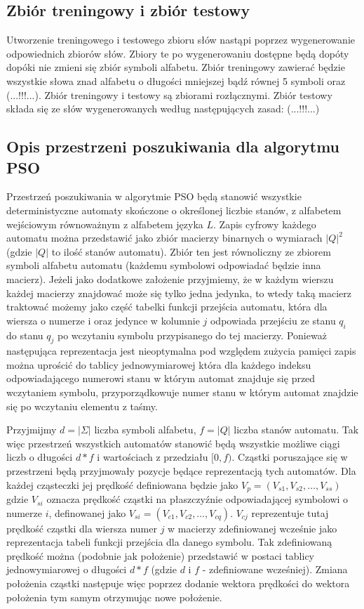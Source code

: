 \documentclass{llncs}
\begin{document}
\subsection{Zbiór treningowy i zbiór testowy}

Utworzenie treningowego i testowego zbioru słów nastąpi poprzez wygenerowanie odpowiednich zbiorów słów. Zbiory te po wygenerowaniu dostępne będą dopóty dopóki nie zmieni się zbiór symboli alfabetu. Zbiór treningowy zawierać będzie wszystkie słowa znad alfabetu o długości mniejszej bądź równej 5 symboli oraz (...!!!...). Zbiór treningowy i testowy są zbiorami rozłącznymi. Zbiór testowy składa się ze słów wygenerowanych według następujących zasad: (...!!!...)

\subsection{Opis przestrzeni poszukiwania dla algorytmu PSO}

Przestrzeń poszukiwania w algorytmie PSO będą stanowić wszystkie deterministyczne automaty skończone o określonej liczbie stanów, z alfabetem wejściowym równoważnym z alfabetem języka $L$. Zapis cyfrowy każdego automatu można przedstawić jako zbiór macierzy binarnych o wymiarach $|Q|^2$ (gdzie $|Q|$ to ilość stanów automatu). Zbiór ten jest równoliczny ze zbiorem symboli alfabetu automatu (każdemu symbolowi odpowiadać będzie inna macierz). Jeżeli jako dodatkowe założenie przyjmiemy, że w każdym wierszu każdej macierzy znajdować może się tylko jedna jedynka, to wtedy taką macierz traktować możemy jako część tabelki funkcji przejścia automatu, która dla wiersza o numerze i oraz jedynce w kolumnie $j$ odpowiada przejściu ze stanu $q_{i}$ do stanu $q_{j}$ po wczytaniu symbolu przypisanego do tej macierzy. Ponieważ następująca reprezentacja jest nieoptymalna pod względem zużycia pamięci zapis można uprościć do tablicy jednowymiarowej która dla każdego indeksu odpowiadającego numerowi stanu w którym automat znajduje się przed wczytaniem symbolu, przyporządkowuje numer stanu w którym automat znajdzie się po wczytaniu elementu z taśmy.

Przyjmijmy $d = |\Sigma|$ liczba symboli alfabetu, $f = |Q|$ liczba stanów automatu. Tak więc przestrzeń wszystkich automatów stanowić będą wszystkie możliwe ciągi liczb o długości $d*f$ i wartościach z przedziału $[0, f)$. Cząstki poruszające się w przestrzeni będą przyjmowały pozycje będące reprezentacją tych automatów. Dla każdej cząsteczki jej prędkość definiowana będzie jako $V_{p} = (V_{s1}, V_{s2}, …, V_{ss})$ gdzie $V_{si}$ oznacza prędkość cząstki na płaszczyźnie odpowiadającej symbolowi o numerze $i$, definowanej jako $V_{si} = (V_{c1}, V_{c2}, …, V_{cq})$. $V_{cj}$ reprezentuje tutaj prędkość cząstki dla wiersza numer $j$ w macierzy zdefiniowanej wcześnie jako reprezentacja tabeli funkcji przejścia dla danego symbolu. Tak zdefiniowaną prędkość można (podobnie jak położenie) przedstawić w postaci tablicy jednowymiarowej o długości $d*f$ (gdzie $d$ i $f$ - zdefiniowane wcześniej). Zmiana położenia cząstki następuje więc poprzez dodanie wektora prędkości do wektora położenia tym samym otrzymując nowe położenie.
\end{document}
